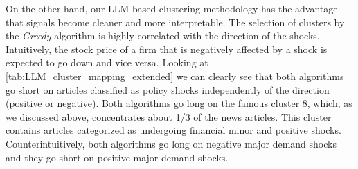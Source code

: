 %
%

\mx 
On the other hand, our LLM-based clustering methodology has the advantage that signals become cleaner and more interpretable. The selection of clusters by the \textit{Greedy} algorithm is highly correlated with the direction of the shocks. Intuitively, the stock price of a firm that is negatively affected by a shock is expected to go down and vice versa.
Looking at \cref{tab:LLM_cluster_mapping_extended} we can clearly see that both algorithms go short on articles classified as policy shocks independently of the direction (positive or negative). Both algorithms go long on the famous cluster 8, which, as we discussed above, concentrates about 1/3 of the news articles. This cluster contains articles categorized as undergoing financial minor and positive shocks.
Counterintuitively, both algorithms go long on negative major demand shocks and they go short on positive major demand shocks. 



